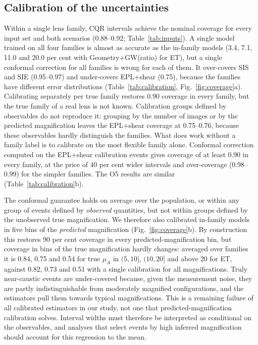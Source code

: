 \subsection{Calibration of the uncertainties}
\label{sec:calibration}
Within a single lens family, CQR intervals achieve the nominal coverage for every input set and both scenarios (0.88--0.92; Table~\ref{tab:inputs}). A single model trained on all four families is almost as accurate as the in-family models (3.4, 7.1, 11.0 and 20.0 per cent with Geometry+GW(ratio) for ET), but a single conformal correction for all families is wrong for each of them. It over-covers SIS and SIE (0.95--0.97) and under-covers EPL+shear (0.75), because the families have different error distributions (Table~\ref{tab:calibration}, Fig.~\ref{fig:coverage}a). Calibrating separately per true family restores 0.90 coverage in every family, but the true family of a real lens is not known. Calibration groups defined by observables do not reproduce it: grouping by the number of images or by the predicted magnification leaves the EPL+shear coverage at 0.75--0.76, because these observables hardly distinguish the families. What does work without a family label is to calibrate on the most flexible family alone. Conformal correction computed on the EPL+shear calibration events gives coverage of at least 0.90 in every family, at the price of 40 per cent wider intervals and over-coverage (0.98--0.99) for the simpler families. The O5 results are similar (Table~\ref{tab:calibration}b).

The conformal guarantee holds on average over the population, or within any group of events defined by \emph{observed} quantities, but not within groups defined by the unobserved true magnification. We therefore also calibrated in-family models in five bins of the \emph{predicted} magnification (Fig.~\ref{fig:coverage}b). By construction this restores 90 per cent coverage in every predicted-magnification bin, but coverage in bins of the true magnification hardly changes: averaged over families it is 0.84, 0.75 and 0.54 for true $\mu_A$ in $(5,10]$, $(10,20]$ and above 20 for ET, against 0.82, 0.73 and 0.51 with a single calibration for all magnifications. Truly near-caustic events are under-covered because, given the measurement noise, they are partly indistinguishable from moderately magnified configurations, and the estimators pull them towards typical magnifications. This is a remaining failure of all calibrated estimators in our study, not one that predicted-magnification calibration solves. Interval widths must therefore be interpreted as conditional on the observables, and analyses that select events by high inferred magnification should account for this regression to the mean.

